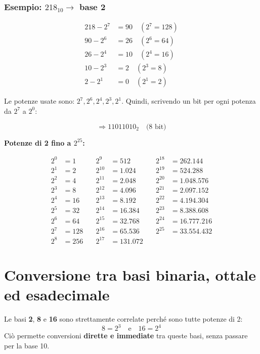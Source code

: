 \documentclass[a4paper,12pt]{report}
\begin{document}
\subsubsection*{Esempio: \(218_{10} \rightarrow \) base 2}
\begin{align*}
218 - 2^7 &= 90 \quad (2^7 = 128) \\
90 - 2^6 &= 26 \quad (2^6 = 64) \\
26 - 2^4 &= 10 \quad (2^4 = 16) \\
10 - 2^3 &= 2 \quad (2^3 = 8) \\
2 - 2^1 &= 0 \quad (2^1 = 2)
\end{align*}

Le potenze usate sono: \(2^7, 2^6, 2^4, 2^3, 2^1\).  
Quindi, scrivendo un bit per ogni potenza da \(2^7\) a \(2^0\):

\[
\Rightarrow \boxed{11011010}_2 \quad \text{(8 bit)}
\]

\begin{notebox}{\textbf{Potenze di 2 fino a \(2^{25}\):}}

\begin{align*}
2^0 &= 1 &\quad 2^9  &= 512 &\quad 2^{18} &= 262.144 \\
2^1 &= 2 &\quad 2^{10} &= 1.024 &\quad 2^{19} &= 524.288 \\
2^2 &= 4 &\quad 2^{11} &= 2.048 &\quad 2^{20} &= 1.048.576 \\
2^3 &= 8 &\quad 2^{12} &= 4.096 &\quad 2^{21} &= 2.097.152 \\
2^4 &= 16 &\quad 2^{13} &= 8.192 &\quad 2^{22} &= 4.194.304 \\
2^5 &= 32 &\quad 2^{14} &= 16.384 &\quad 2^{23} &= 8.388.608 \\
2^6 &= 64 &\quad 2^{15} &= 32.768 &\quad 2^{24} &= 16.777.216 \\
2^7 &= 128 &\quad 2^{16} &= 65.536 &\quad 2^{25} &= 33.554.432 \\
2^8 &= 256 &\quad 2^{17} &= 131.072 &&
\end{align*}

\end{notebox}




\newpage
\section{Conversione tra basi binaria, ottale ed esadecimale}

Le basi \textbf{2}, \textbf{8} e \textbf{16} sono strettamente correlate perché sono tutte potenze di 2:
\[
8 = 2^3 \quad \text{e} \quad 16 = 2^4
\]
Ciò permette conversioni \textbf{dirette e immediate} tra queste basi, senza passare per la base 10.
\end{document}
